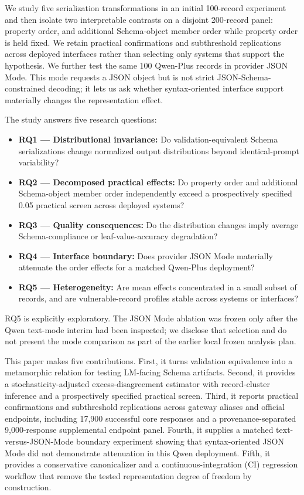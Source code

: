 \documentclass[11pt,a4paper]{article}
\begin{document}
We study five serialization transformations in an initial 100-record experiment and then isolate two interpretable contrasts on a disjoint 200-record panel: property order, and additional Schema-object member order while property order is held fixed. We retain practical confirmations and subthreshold replications across deployed interfaces rather than selecting only systems that support the hypothesis. We further test the same 100 Qwen-Plus records in provider JSON Mode. This mode requests a JSON object but is not strict JSON-Schema-constrained decoding; it lets us ask whether syntax-oriented interface support materially changes the representation effect.

The study answers five research questions:

\begin{itemize}
\item \textbf{RQ1 --- Distributional invariance:} Do validation-equivalent Schema serializations change normalized output distributions beyond identical-prompt variability?
\item \textbf{RQ2 --- Decomposed practical effects:} Do property order and additional Schema-object member order independently exceed a prospectively specified 0.05 practical screen across deployed systems?
\item \textbf{RQ3 --- Quality consequences:} Do the distribution changes imply average Schema-compliance or leaf-value-accuracy degradation?
\item \textbf{RQ4 --- Interface boundary:} Does provider JSON Mode materially attenuate the order effects for a matched Qwen-Plus deployment?
\item \textbf{RQ5 --- Heterogeneity:} Are mean effects concentrated in a small subset of records, and are vulnerable-record profiles stable across systems or interfaces?
\end{itemize}
RQ5 is explicitly exploratory. The JSON Mode ablation was frozen only after the Qwen text-mode interim had been inspected; we disclose that selection and do not present the mode comparison as part of the earlier local frozen analysis plan.

This paper makes five contributions. First, it turns validation equivalence into a metamorphic relation for testing LM-facing Schema artifacts. Second, it provides a stochasticity-adjusted excess-disagreement estimator with record-cluster inference and a prospectively specified practical screen. Third, it reports practical confirmations and subthreshold replications across gateway aliases and official endpoints, including 17,900 successful core responses and a provenance-separated 9,000-response supplemental endpoint panel. Fourth, it supplies a matched text-versus-JSON-Mode boundary experiment showing that syntax-oriented JSON Mode did not demonstrate attenuation in this Qwen deployment. Fifth, it provides a conservative canonicalizer and a continuous-integration (CI) regression workflow that remove the tested representation degree of freedom by construction.
\end{document}
